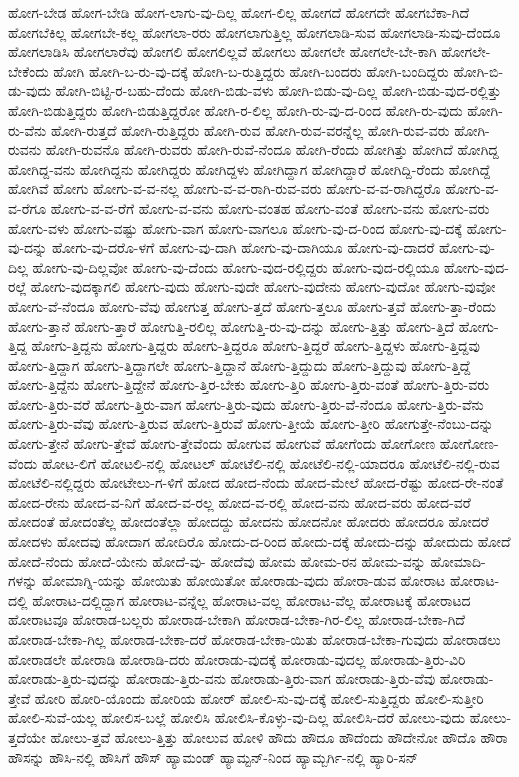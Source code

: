 {ಹೋಗ-ಬೇಡ
ಹೋಗ-ಬೇಡಿ
ಹೋಗ-ಲಾಗು-ವು-ದಿಲ್ಲ
ಹೋಗ-ಲಿಲ್ಲ
ಹೋಗದೆ
ಹೋಗದೇ
ಹೋಗಬೆಕಾ-ಗಿದೆ
ಹೋಗಬೆಕಿಲ್ಲ
ಹೋಗಬೇ-ಕಲ್ಲ
ಹೋಗಲಾ-ರರು
ಹೋಗಲಾಗುತ್ತಿಲ್ಲ
ಹೋಗಲಾಡಿ-ಸುವ
ಹೋಗಲಾಡಿ-ಸುವು-ದೆಂದೂ
ಹೋಗಲಾಡಿಸಿ
ಹೋಗಲಾರೆವು
ಹೋಗಲಿ
ಹೋಗಲಿಲ್ಲವೆ
ಹೋಗಲು
ಹೋಗಲೇ
ಹೋಗಲೇ-ಬೇ-ಕಾಗಿ
ಹೋಗಲೇ-ಬೇಕೆಂದು
ಹೋಗಿ
ಹೋಗಿ-ಬ-ರು-ವು-ದಕ್ಕೆ
ಹೋಗಿ-ಬ-ರುತ್ತಿದ್ದರು
ಹೋಗಿ-ಬಂದರು
ಹೋಗಿ-ಬಂದಿದ್ದರು
ಹೋಗಿ-ಬಿ-ಡು-ವುದು
ಹೋಗಿ-ಬಿಟ್ಟಿ-ರ-ಬಹು-ದೆಂದು
ಹೋಗಿ-ಬಿಡು-ವಳು
ಹೋಗಿ-ಬಿಡು-ವು-ದಿಲ್ಲ
ಹೋಗಿ-ಬಿಡು-ವುದ-ರಲ್ಲಿತ್ತು
ಹೋಗಿ-ಬಿಡುತ್ತಿದ್ದರು
ಹೋಗಿ-ಬಿಡುತ್ತಿದ್ದರೋ
ಹೋಗಿ-ರ-ಲಿಲ್ಲ
ಹೋಗಿ-ರು-ವು-ದ-ರಿಂದ
ಹೋಗಿ-ರು-ವುದು
ಹೋಗಿ-ರು-ವೆನು
ಹೋಗಿ-ರುತ್ತದೆ
ಹೋಗಿ-ರುತ್ತಿದ್ದರು
ಹೋಗಿ-ರುವ
ಹೋಗಿ-ರುವ-ವರನ್ನೆಲ್ಲ
ಹೋಗಿ-ರುವ-ವರು
ಹೋಗಿ-ರುವನು
ಹೋಗಿ-ರುವನೊ
ಹೋಗಿ-ರುವರು
ಹೋಗಿ-ರುವೆ-ನೆಂದೂ
ಹೋಗಿ-ರೆಂದು
ಹೋಗಿತ್ತು
ಹೋಗಿದೆ
ಹೋಗಿದ್ದ
ಹೋಗಿದ್ದ-ವನು
ಹೋಗಿದ್ದನು
ಹೋಗಿದ್ದರು
ಹೋಗಿದ್ದಳು
ಹೋಗಿದ್ದಾಗ
ಹೋಗಿದ್ದಾರೆ
ಹೋಗಿದ್ದಿ-ರೆಂದು
ಹೋಗಿದ್ದೆ
ಹೋಗಿವೆ
ಹೋಗು
ಹೋಗು-ವ-ವ-ನಲ್ಲ
ಹೋಗು-ವ-ವ-ರಾಗಿ-ರುವ-ವರು
ಹೋಗು-ವ-ವ-ರಾಗಿದ್ದರೊ
ಹೋಗು-ವ-ವ-ರೆಗೂ
ಹೋಗು-ವ-ವ-ರೆಗೆ
ಹೋಗು-ವ-ವನು
ಹೋಗು-ವಂತಹ
ಹೋಗು-ವಂತೆ
ಹೋಗು-ವನು
ಹೋಗು-ವರು
ಹೋಗು-ವಳು
ಹೋಗು-ವಷ್ಟು
ಹೋಗು-ವಾಗ
ಹೋಗು-ವಾಗಲೂ
ಹೋಗು-ವು-ದ-ರಿಂದ
ಹೋಗು-ವು-ದಕ್ಕೆ
ಹೋಗು-ವು-ದನ್ನು
ಹೋಗು-ವು-ದರೊ-ಳಗೆ
ಹೋಗು-ವು-ದಾಗಿ
ಹೋಗು-ವು-ದಾಗಿಯೂ
ಹೋಗು-ವು-ದಾದರೆ
ಹೋಗು-ವು-ದಿಲ್ಲ
ಹೋಗು-ವು-ದಿಲ್ಲವೋ
ಹೋಗು-ವು-ದೆಂದು
ಹೋಗು-ವುದ-ರಲ್ಲಿದ್ದರು
ಹೋಗು-ವುದ-ರಲ್ಲಿಯೂ
ಹೋಗು-ವುದ-ರಲ್ಲೆ
ಹೋಗು-ವುದಕ್ಕಾಗಲಿ
ಹೋಗು-ವುದು
ಹೋಗು-ವುದೇ
ಹೋಗು-ವುದೇನು
ಹೋಗು-ವುದೋ
ಹೋಗು-ವುವೋ
ಹೋಗು-ವೆ-ನೆಂದೂ
ಹೋಗು-ವೆವು
ಹೋಗುತ್ತ
ಹೋಗು-ತ್ತದೆ
ಹೋಗು-ತ್ತಲೂ
ಹೋಗು-ತ್ತವೆ
ಹೋಗು-ತ್ತಾ-ರೆಂದು
ಹೋಗು-ತ್ತಾನೆ
ಹೋಗು-ತ್ತಾರೆ
ಹೋಗುತ್ತಿ-ರಲಿಲ್ಲ
ಹೋಗುತ್ತಿ-ರು-ವು-ದನ್ನು
ಹೋಗು-ತ್ತಿತ್ತು
ಹೋಗು-ತ್ತಿದೆ
ಹೋಗು-ತ್ತಿದ್ದ
ಹೋಗು-ತ್ತಿದ್ದನು
ಹೋಗು-ತ್ತಿದ್ದರು
ಹೋಗು-ತ್ತಿದ್ದರೂ
ಹೋಗು-ತ್ತಿದ್ದರೆ
ಹೋಗು-ತ್ತಿದ್ದಳು
ಹೋಗು-ತ್ತಿದ್ದವು
ಹೋಗು-ತ್ತಿದ್ದಾಗ
ಹೋಗು-ತ್ತಿದ್ದಾಗಲೇ
ಹೋಗು-ತ್ತಿದ್ದಾನೆ
ಹೋಗು-ತ್ತಿದ್ದುದು
ಹೋಗು-ತ್ತಿದ್ದುವು
ಹೋಗು-ತ್ತಿದ್ದೆ
ಹೋಗು-ತ್ತಿದ್ದೆನು
ಹೋಗು-ತ್ತಿದ್ದೇನೆ
ಹೋಗು-ತ್ತಿರ-ಬೇಕು
ಹೋಗು-ತ್ತಿರಿ
ಹೋಗು-ತ್ತಿರು-ವಂತೆ
ಹೋಗು-ತ್ತಿರು-ವರು
ಹೋಗು-ತ್ತಿರು-ವರೆ
ಹೋಗು-ತ್ತಿರು-ವಾಗ
ಹೋಗು-ತ್ತಿರು-ವುದು
ಹೋಗು-ತ್ತಿರು-ವೆ-ನೆಂದೂ
ಹೋಗು-ತ್ತಿರು-ವೆನು
ಹೋಗು-ತ್ತಿರು-ವೆವು
ಹೋಗು-ತ್ತಿರುವ
ಹೋಗು-ತ್ತಿರುವೆ
ಹೋಗು-ತ್ತೀಯೆ
ಹೋಗು-ತ್ತೀರಿ
ಹೋಗುತ್ತೇ-ನೆಂಬು-ದನ್ನು
ಹೋಗು-ತ್ತೇನೆ
ಹೋಗು-ತ್ತೇವೆ
ಹೋಗು-ತ್ತೇವೆಂದು
ಹೋಗುವ
ಹೋಗುವೆ
ಹೋಗೆಂದು
ಹೋಗೋಣ
ಹೋಗೋಣ-ವೆಂದು
ಹೋಟ-ಲಿಗೆ
ಹೋಟಲಿ-ನಲ್ಲಿ
ಹೋಟಲ್
ಹೋಟೆಲಿ-ನಲ್ಲಿ
ಹೋಟೆಲಿ-ನಲ್ಲಿ-ಯಾದರೂ
ಹೋಟೆಲಿ-ನಲ್ಲಿ-ರುವ
ಹೋಟೆಲಿ-ನಲ್ಲಿದ್ದರು
ಹೋಟೇಲು-ಗ-ಳಿಗೆ
ಹೋದ
ಹೋದ-ನೆಂದು
ಹೋದ-ಮೇಲೆ
ಹೋದ-ರೆಷ್ಟು
ಹೋದ-ರೇ-ನಂತೆ
ಹೋದ-ರೇನು
ಹೋದ-ವ-ನಿಗೆ
ಹೋದ-ವ-ರಲ್ಲ
ಹೋದ-ವ-ರಲ್ಲಿ
ಹೋದ-ವನು
ಹೋದ-ವರು
ಹೋದ-ವರೆ
ಹೋದಂತೆ
ಹೋದಂತೆಲ್ಲ
ಹೋದಂತೆಲ್ಲಾ
ಹೋದದ್ದು
ಹೋದನು
ಹೋದನೋ
ಹೋದರು
ಹೋದರೂ
ಹೋದರೆ
ಹೋದಳು
ಹೋದವು
ಹೋದಾಗ
ಹೋದಿರೊ
ಹೋದು-ದ-ರಿಂದ
ಹೋದು-ದಕ್ಕೆ
ಹೋದು-ದನ್ನು
ಹೋದುದು
ಹೋದೆ
ಹೋದೆ-ನೆಂದು
ಹೋದೆ-ಯೇನು
ಹೋದೆ-ವು-
ಹೋದೆವು
ಹೋಮ
ಹೋಮ-ರನ
ಹೋಮ-ವನ್ನು
ಹೋಮಾದಿ-ಗಳನ್ನು
ಹೋಮಾಗ್ನಿ-ಯನ್ನು
ಹೋಯಿತು
ಹೋಯಿತೋ
ಹೋರಾಡು-ವುದು
ಹೋರಾ-ಡುವ
ಹೋರಾಟ
ಹೋರಾಟ-ದಲ್ಲಿ
ಹೋರಾಟ-ದಲ್ಲಿದ್ದಾಗ
ಹೋರಾಟ-ವನ್ನೆಲ್ಲ
ಹೋರಾಟ-ವಲ್ಲ
ಹೋರಾಟ-ವೆಲ್ಲ
ಹೋರಾಟಕ್ಕೆ
ಹೋರಾಟದ
ಹೋರಾಟವೂ
ಹೋರಾಡ-ಬಲ್ಲರು
ಹೋರಾಡ-ಬೇಕಾಗಿ
ಹೋರಾಡ-ಬೇಕಾ-ಗಿರ-ಲಿಲ್ಲ
ಹೋರಾಡ-ಬೇಕಾ-ಗಿದೆ
ಹೋರಾಡ-ಬೇಕಾ-ಗಿಲ್ಲ
ಹೋರಾಡ-ಬೇಕಾ-ದರೆ
ಹೋರಾಡ-ಬೇಕಾ-ಯಿತು
ಹೋರಾಡ-ಬೇಕಾ-ಗುವುದು
ಹೋರಾಡಲು
ಹೋರಾಡಲೇ
ಹೋರಾಡಿ
ಹೋರಾಡಿ-ದರು
ಹೋರಾಡು-ವುದಕ್ಕೆ
ಹೋರಾಡು-ವುದಲ್ಲ
ಹೋರಾಡು-ತ್ತಿರು-ವಿರಿ
ಹೋರಾಡು-ತ್ತಿರು-ವುದನ್ನು
ಹೋರಾಡು-ತ್ತಿರು-ವನು
ಹೋರಾಡು-ತ್ತಿರು-ವಾಗ
ಹೋರಾಡು-ತ್ತಿರು-ವೆವು
ಹೋರಾಡು-ತ್ತೇವೆ
ಹೋರಿ
ಹೋರಿ-ಯೊಂದು
ಹೋರಿಯ
ಹೋರ್
ಹೋಲಿ-ಸು-ವು-ದಕ್ಕೆ
ಹೋಲಿ-ಸುತ್ತಿದ್ದರು
ಹೋಲಿ-ಸುತ್ತೀರಿ
ಹೋಲಿ-ಸುವೆ-ಯಲ್ಲ
ಹೋಲಿಸ-ಬಲ್ಲೆ
ಹೋಲಿಸಿ
ಹೋಲಿಸಿ-ಕೊಳ್ಳು-ವು-ದಿಲ್ಲ
ಹೋಲಿಸಿ-ದರೆ
ಹೋಲು-ವುದು
ಹೋಲು-ತ್ತದೆಯೇ
ಹೋಲು-ತ್ತವೆ
ಹೋಲು-ತ್ತಿತ್ತು
ಹೋಲುವ
ಹೋಳಿ
ಹೌದು
ಹೌದೂ
ಹೌದೆಂದು
ಹೌದೇನೋ
ಹೌದೊ
ಹೌರಾ
ಹೌಸನ್ನು
ಹೌಸಿ-ನಲ್ಲಿ
ಹೌಸಿಗೆ
ಹೌಸ್
ಹ್ಯಾಮಂಡ್
ಹ್ಯಾಮ್ಟನ್-ನಿಂದ
ಹ್ಯಾಮ್ಬರ್ಗಿ-ನಲ್ಲಿ
ಹ್ಯಾರಿ-ಸನ್
}
